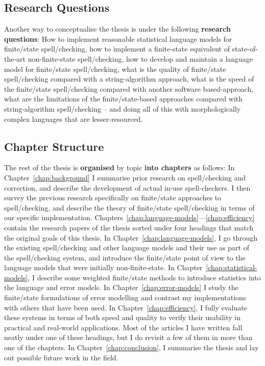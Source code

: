 \documentclass[officiallayout,final]{unihelcompling}
\begin{document}
\subsection{Research Questions}
\label{subsec:questions}

Another way to conceptualise the thesis is under the following \textbf{research
questions}: How to implement reasonable statistical language models for
finite\-/state spell\-/checking, how to implement a finite-state equivalent of
state-of-the-art non-finite-state spell\-/checking, how to develop and maintain
a language model for finite\-/state spell\-/checking, what is the quality of
finite\-/state spell\-/checking compared with a string-algorithm approach, what
is the speed of the finite\-/state spell\-/checking compared with another
software based-approach, what are the limitations of the finite\-/state-based
approaches compared with string-algorithm spell\-/checking -- and doing all of
this with morphologically complex languages that are lesser-resourced.

\subsection{Chapter Structure}

The rest of the thesis is \textbf{organised} by topic \textbf{into chapters} as
follows: In Chapter~\ref{chap:background} I summarise prior research on
spell\-/checking and correction, and describe the development of actual in-use
spell-checkers. I then survey the previous research specifically on
finite\-/state approaches to spell\-/checking, and describe the theory of
finite\-/state spell\-/checking in terms of our specific implementation.
Chapters~\ref{chap:language-models}---\ref{chap:efficiency} contain the
research papers of the thesis sorted under four headings that match the
original goals of this thesis.  In Chapter~\ref{chap:language-models}, I go
through the existing spell\-/checking and other language models and their use
as part of the spell\-/checking system, and introduce the finite\-/state point
of view to the language models that were initially non-finite-state.  In
Chapter~\ref{chap:statistical-models}, I describe some weighted finite\-/state
methods to introduce statistics into the language and error models.  In
Chapter~\ref{chap:error-models} I study the finite\-/state formulations of
error modelling and contrast my implementations with others that have been
used.  In Chapter~\ref{chap:efficiency}, I fully evaluate these systems in
terms of both speed and quality to verify their usability in practical and
real-world applications.  Most of the articles I have written fall neatly under
one of these headings, but I do revisit a few of them in more than one of the
chapters. In Chapter~\ref{chap:conclusion}, I summarise the thesis and lay out
possible future work in the field.
\end{document}
